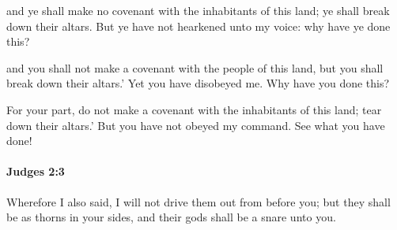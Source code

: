 			\begin{versebox}
					\item[BHS] 
					\item[ASV] and ye shall make no covenant with the inhabitants of this land; ye shall break down their altars. But ye have not hearkened unto my voice: why have ye done this?
					\item[NIV] and you shall not make a covenant with the people of this land, but you shall break down their altars.’ Yet you have disobeyed me. Why have you done this?
					\item[NRSV] For your part, do not make a covenant with the inhabitants of this land; tear down their altars.’ But you have not obeyed my command. See what you have done!
			\end{versebox}

		\paragraph{Judges 2:3} %
			\label{JUDGES-2-3}

			Wherefore I also said, I will not drive them out from before you; but they shall be as thorns in your sides, and their gods shall be a snare unto you.


